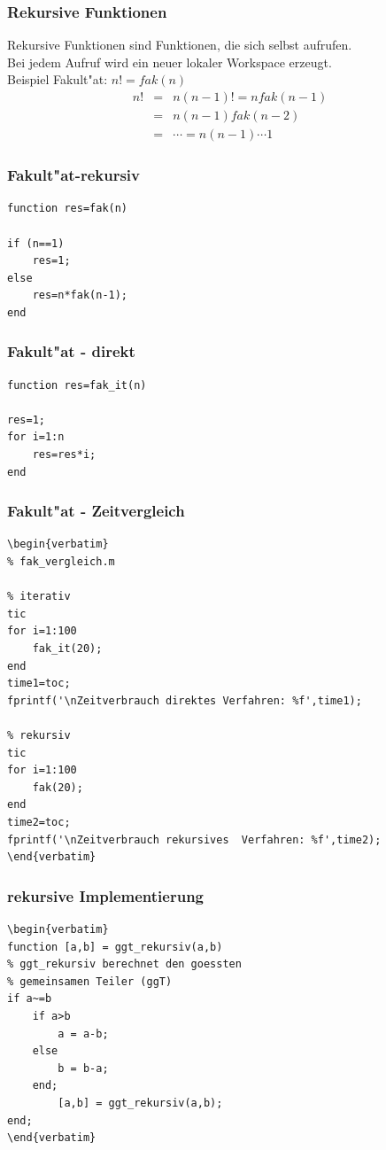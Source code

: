 %
% 
\begin{frame}[fragile]\frametitle{Rekursive Funktionen}
Rekursive Funktionen sind Funktionen, die sich selbst aufrufen.\\
Bei jedem Aufruf wird ein neuer lokaler Workspace erzeugt.\\[1cm]

Beispiel Fakult"at: $n!=fak(n)$\\
\begin{eqnarray*}
 n!& = & n(n-1)!=nfak(n-1)\\
& = & n(n-1)fak(n-2)\\
& = & \cdots= n(n-1)\cdots 1 
\end{eqnarray*}
\end{frame}
%
%
\begin{frame}[fragile]\frametitle{Fakult"at-rekursiv}
\begin{lstlisting}
function res=fak(n)

if (n==1)
    res=1;
else 
    res=n*fak(n-1);
end
\end{lstlisting}
\end{frame}
%
%
\begin{frame}[fragile]\frametitle{Fakult"at - direkt}
\begin{lstlisting}
function res=fak_it(n)

res=1;
for i=1:n
    res=res*i;
end
\end{lstlisting}
\end{frame}
%
%
\begin{frame}[fragile]\frametitle{Fakult"at - Zeitvergleich}
\begin{lstlisting}
\begin{verbatim}
% fak_vergleich.m

% iterativ
tic
for i=1:100
    fak_it(20);
end
time1=toc;
fprintf('\nZeitverbrauch direktes Verfahren: %f',time1);

% rekursiv
tic
for i=1:100
    fak(20);
end
time2=toc;
fprintf('\nZeitverbrauch rekursives  Verfahren: %f',time2);
\end{verbatim}
\end{lstlisting}
\end{frame}
%
%
\begin{frame}[fragile]\frametitle{rekursive Implementierung}

\begin{lstlisting}
\begin{verbatim}
function [a,b] = ggt_rekursiv(a,b)
% ggt_rekursiv berechnet den goessten 
% gemeinsamen Teiler (ggT) 
if a~=b
    if a>b
        a = a-b;
    else
        b = b-a;
    end;
        [a,b] = ggt_rekursiv(a,b);
end;
\end{verbatim}
\end{lstlisting}
\end{frame}
